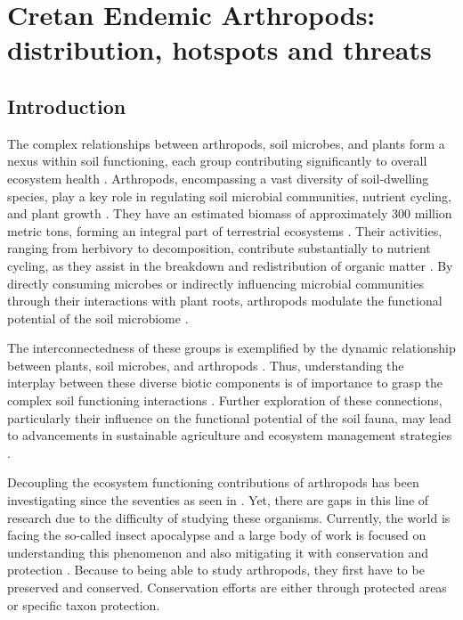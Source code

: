 % 
% 


\chapter{Cretan Endemic Arthropods: distribution, hotspots and threats}
\label{cha:arthropods}

\section{Introduction}
\label{sec:arthropods-intro}

The complex relationships between arthropods, soil microbes, and plants
form a nexus within soil functioning, each group contributing significantly to
overall ecosystem health \parencite{rentao2023soil, insects11010054}.
Arthropods, encompassing a vast diversity of soil-dwelling species,
play a key role in regulating soil microbial communities, nutrient cycling, and
plant growth \parencite{COLEMAN2024131}.
They have an estimated biomass of
approximately 300 million metric tons, forming an integral part of terrestrial ecosystems \parencite{milo-arthropods}.
Their activities, ranging from herbivory to decomposition, contribute substantially
to nutrient cycling, as they assist in the breakdown and redistribution of organic matter \parencite{COLEMAN2024131}.
By directly consuming microbes or
indirectly influencing microbial communities through their interactions with
plant roots, arthropods modulate the functional potential of the soil microbiome \parencite{Thakur2019}.

The interconnectedness of these groups is exemplified by the dynamic relationship
between plants, soil microbes, and arthropods \parencite{Fry2019}.
Thus, understanding the interplay between these diverse biotic components is of
importance to grasp the complex soil functioning interactions \parencite{briones2014soilfauna}.
Further exploration of these connections, particularly their influence on the
functional potential of the soil fauna, may lead to advancements in
sustainable agriculture and ecosystem management strategies \parencite{GRANDY201640}.

Decoupling the ecosystem functioning contributions of arthropods has been investigating since the seventies as seen in \textcite{rosswall1997energetical}.
Yet, there are gaps in this line of research due to the difficulty of studying these organisms.
Currently, the world is facing the so-called insect apocalypse and a large 
body of work is focused on understanding this phenomenon and also mitigating it with 
conservation and protection \parencite{cardoso2019predicting}. Because to being able to study arthropods, they
first have to be preserved and conserved.
Conservation efforts are either through protected areas or specific taxon protection.


